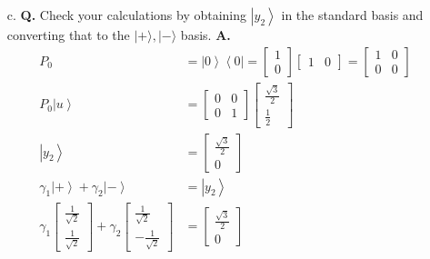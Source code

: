 \documentclass[main.tex]{subfiles}
\begin{document}
\begin{enumerate}
\begin{enumerate}
        \item[c.] \textbf{Q.} Check your calculations by obtaining $\left|y_{2}\right\rangle$ in the standard basis and converting that to the $|+\rangle,|-\rangle$ basis. \textbf{A.}
        \begin{align*}
            P_{0}                                                                                               & = \left|0\right\rangle \left\langle 0\right| 
                                                                                                                = \left[\begin{array}{l} 1 \\ 0 \end{array}\right] \left[\begin{array}{ll} 1 & 0 \end{array}\right] 
                                                                                                                = \left[\begin{array}{ll} 1 & 0 \\ 0 & 0 \end{array}\right] \\
            P_{0} \left|u\right\rangle                                                                          & = \left[\begin{array}{ll} 0 & 0 \\ 0 & 1 \end{array}\right] 
                                                                                                                \left[\begin{array}{c} \frac{\sqrt{3}}{2} \\ \frac{1}{2} \end{array}\right] \\
            \left|y_{2}\right\rangle                                                                            & = \left[\begin{array}{c} \frac{\sqrt{3}}{2} \\ 0 \end{array}\right] \\
            \gamma_{1}\left|+\right\rangle+\gamma_{2}\left|-\right\rangle                                       & = \left|y_{2}\right\rangle\\
            \gamma_{1} \left[\begin{array}{l} \frac{1}{\sqrt{2}} \\ \frac{1}{\sqrt{2}} \end{array}\right]
            + \gamma_{2} \left[\begin{array}{l} \frac{1}{\sqrt{2}} \\ -\frac{1}{\sqrt{2}} \end{array}\right]    & = \left[\begin{array}{c} \frac{\sqrt{3}}{2} \\ 0 \end{array}\right]\\

\end{align*}
\end{enumerate}
\end{enumerate}
\end{document}
